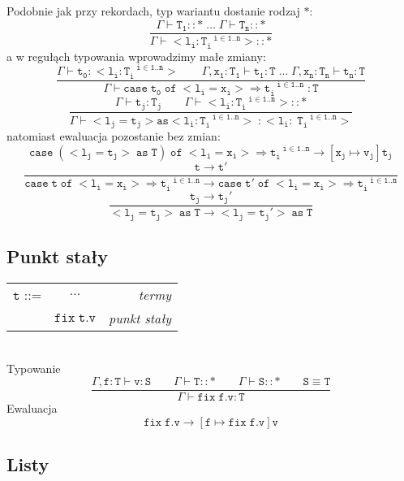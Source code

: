 \documentclass[11pt,leqno]{article}
\begin{document}
Podobnie jak przy rekordach, typ wariantu dostanie rodzaj $\mathtt{\ast}$:
 	\[\mathtt{
             \frac{\Gamma \vdash T_1::\ast \;\dots\;\Gamma \vdash T_n::\ast}{\Gamma \vdash <l_i:T_i^{\;\;\;i \in 1..n}>::\ast}
		}
	\]
a w regułąch typowania wprowadzimy małe zmiany:
 	\[\mathtt{ \frac{\Gamma \vdash t_0:<l_i:T_i^{\;\;\;i \in 1..n}> \hspace{2em} \Gamma,x_1:T_1 \vdash t_1:T \;\dots\; \Gamma,x_n:T_n \vdash t_n:T}{\Gamma \vdash case\;t_0\;of\;<l_i=x_i>\Rightarrow t_i^{\;\;\;i \in 1..n}\; : T}
		}
	\]
 	\[\mathtt{ \frac{\Gamma \vdash t_j : T_j \hspace{2em} \Gamma \vdash <l_i:T_i^{\;\;\;i \in 1..n}>::\ast}{\Gamma \vdash <l_j=t_j> as <l_i:T_i^{\;\;\;i \in 1..n}> \;: <l_i:\;T_i^{\;\;\;i \in 1..n}>}
		}
	\]
natomiast ewaluacja pozostanie bez zmian:
 	\[\mathtt{ case\;(<l_j=t_j>\;as\;T)\;of\;<l_i=x_i>\Rightarrow t_i^{\;\;\;i \in 1..n} \longrightarrow [x_j \mapsto v_j]t_j
		}
	\]
 	\[\mathtt{ \frac{t \longrightarrow t'}{case\;t\;of\;<l_i=x_i>\Rightarrow t_i^{\;\;\;i \in 1..n} \longrightarrow case\;t'\;of\;<l_i=x_i>\Rightarrow t_i^{\;\;\;i \in 1..n} }
		}
	\]
 	\[\mathtt{ \frac{t_j \longrightarrow t_j'}{<l_j=t_j>\;as\;T \longrightarrow <l_j=t_j'>\;as\;T }
		}
	\]

\subsection{Punkt stały}

\begin{tabular}{| l c r |}
  \hline
  $\mathtt{t}$ ::= & $\dots$ & \textit{termy}  \\
   & $\mathtt{fix \;t.v}$ & \textit{punkt stały}\\
  \hline
\end{tabular} \\

Typowanie \\
 	\[\mathtt{\frac{\Gamma, f:T \vdash v:S \hspace{2em} \Gamma \vdash T::\ast\hspace{2em} \Gamma \vdash S::\ast \hspace{2em} S\equiv T}{\Gamma \vdash fix\;f.v:T}}
	\]
Ewaluacja \\
 	\[\mathtt{ fix\;f.v \longrightarrow [f \mapsto fix\;f.v]v
		}
	\]

\subsection{Listy}
\end{document}
